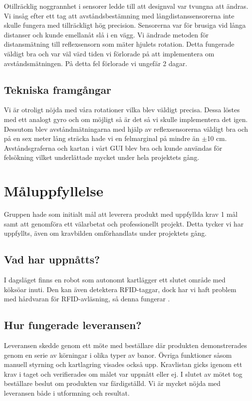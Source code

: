 \documentclass[a4paper,12pt,fleqn]{article}
\begin{document}
Otillräcklig noggrannhet i sensorer ledde till att designval var tvungna att ändras.
Vi insåg efter ett tag att avståndsbestämning med långdistanssensorerna inte skulle fungera med tillräckligt hög precision. Sensorerna var för brusiga vid långa distanser och kunde emellanåt slå i en vägg. Vi ändrade metoden för distansmätning till reflexsensorn som mäter hjulets rotation. Detta fungerade väldigt bra och var väl värd tiden vi förlorade på att implementera om avståndsmätningen. På detta fel förlorade vi ungefär 2 dagar.

\subsection{Tekniska framgångar}
Vi är otroligt nöjda med våra rotationer vilka blev väldigt precisa.
Dessa löstes med ett analogt gyro och om möjligt så är det så vi skulle implementera det igen. Dessutom blev avståndmätningarna med hjälp av reflexsensorerna väldigt bra och på en sex meter lång sträcka hade vi en felmarginal på mindre än $\pm$10 cm. Avståndsgraferna och kartan i vårt GUI blev bra och kunde användas för felsökning vilket underlättade mycket under hela projektets gång. 

\section{Måluppfyllelse}
Gruppen hade som initialt mål att leverera produkt med uppfyllda krav 1 mål samt att genomföra ett välarbetat och professionellt projekt. Detta tycker vi har uppfyllts, även om kravbilden omförhandlats under projektets gång. 

\subsection{Vad har uppnåtts?}
I dagsläget finns en robot som autonomt kartlägger ett slutet område med köksöar inuti. Den kan även detektera RFID-taggar, dock har vi haft problem med hårdvaran för RFID-avläsning, så denna fungerar . 

\subsection{Hur fungerade leveransen?}
Leveransen skedde genom ett möte med beställare där produkten demonstrerades genom en serie av körningar i olika typer av banor. Övriga funktioner såsom manuell styrning och kartlagring visades också upp. Kravlistan gicks igenom ett krav i taget och verifierades om målet var uppnått eller ej. I slutet av mötet tog beställare beslut om produkten var färdigställd. Vi är mycket nöjda med leveransen både i utformning och resultat.
\end{document}
